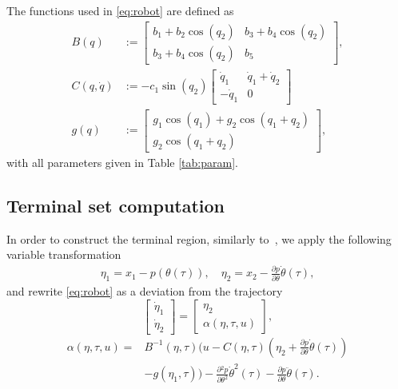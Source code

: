 \documentclass[journal]{IEEEtran}
\newcommand {\matr}[2]{\left[\begin{array}{#1}#2\end{array}\right]}
\begin{document}
	The functions used in \eqref{eq:robot} are defined as
	\begin{subequations}\label{eq:modelparams}
		\begin{align}
		B(q) &:= \matr{cc}{b_1+b_2\cos(q_2) & b_3+b_4\cos(q_2)\\ 
			b_3+b_4\cos(q_2) & b_5},\\
		C(q,\dot{q}) &:= -c_1\sin(q_2)\matr{cc}{\dot{q}_1 & \dot{q}_1+\dot{q}_2\\
			-\dot{q}_1	&  0}\\
		g(q) &:= \matr{c}{g_1\cos(q_1)+g_2\cos(q_1+q_2)\\
			g_2\cos(q_1+q_2)},
		\end{align}
	\end{subequations}
	with all parameters given in Table \ref{tab:param}.
	
	
	\subsection{Terminal set computation}\label{appendix:terminal}
	In order to construct the terminal region, similarly to~\cite{Faulwasser2016}, we apply the following variable transformation
	\begin{gather}
	\eta_1 = x_1 - p(\theta(\tau)),\quad \eta_2 = x_2 - \frac{\partial{}p}{\partial\theta}\dot{\theta}(\tau),
	\end{gather}
	and rewrite \eqref{eq:robot} as a deviation from the trajectory
	\begin{equation}\label{eq:robot_error}
	\matr{c}{\dot\eta_1\\\dot\eta_2} = \matr{c}{ \eta_2\\ \alpha(\eta,\tau,u)},
	\end{equation}
	\begin{align*}
	\alpha(\eta,\tau,u) = &B^{-1}(\eta,\tau)\Big(u - C(\eta,\tau)(\eta_2+ \frac{\partial{}p}{\partial\theta}\dot{\theta}(\tau))\\
	&-g(\eta_1,\tau)\Big) - \frac{\partial{}^2p}{\partial\theta^2}\dot{\theta}^2(\tau)- \frac{\partial{}p}{\partial\theta}\ddot{\theta}(\tau).
	\end{align*}
	
\end{document}
